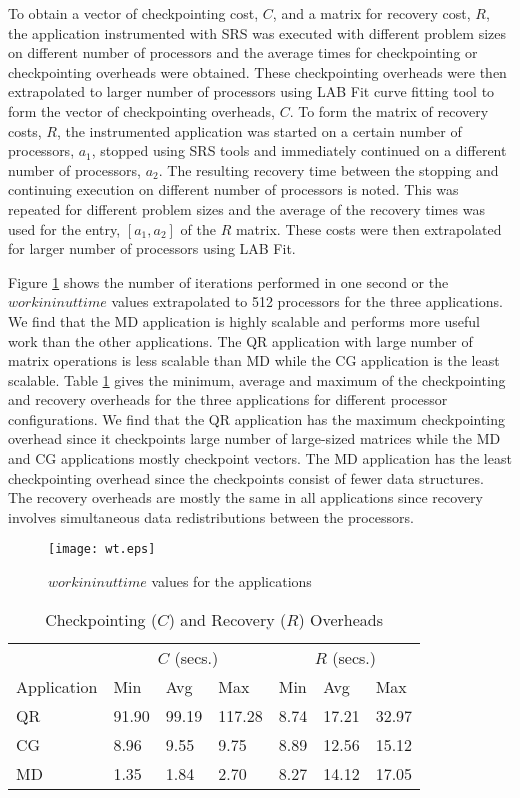 \documentclass[conference,10pt]{IEEEtran}
\begin{document}
To obtain a vector of checkpointing cost, $C$, and a matrix for
recovery cost, $R$, the application instrumented with SRS was executed
with different problem sizes on different number of processors and the
average times for checkpointing or checkpointing overheads were
obtained. These checkpointing overheads were then extrapolated to
larger number of processors using LAB Fit curve fitting
tool\cite{labfit} to form the vector of checkpointing overheads,
$C$. To form the matrix of recovery costs, $R$, the instrumented
application was started on a certain number of processors, $a_1$,
stopped using SRS tools and immediately continued on a different
number of processors, $a_2$. The resulting recovery time between the
stopping and continuing execution on different number of processors is
noted. This was repeated for different problem sizes and the average
of the recovery times was used for the entry, $[a_1,a_2]$ of the $R$
matrix. These costs were then extrapolated for larger number of
processors using LAB Fit.

Figure \ref{wt} shows the number of iterations performed in one second
or the $workininuttime$ values extrapolated to 512 processors for the
three applications. We find that the MD application is highly scalable
and performs more useful work than the other applications. The QR
application with large number of matrix operations is less
scalable than MD while the CG application is the least scalable. Table
\ref{overheads} gives the minimum, average and maximum of the
checkpointing and recovery overheads for the three applications for
different processor configurations. We find that the QR application
has the maximum checkpointing overhead since it checkpoints large
number of large-sized matrices while the MD and CG applications mostly
checkpoint vectors. The MD application has the least checkpointing
overhead since the checkpoints consist of fewer data structures. The
recovery overheads are mostly the same in all applications since
recovery involves simultaneous data redistributions between the
processors.

\begin{figure}
\centering
\texttt{[image: wt.eps]}
\caption{$workininuttime$ values for the applications}
\label{wt}
\end{figure}

\begin{table}
\centering
\caption{Checkpointing ($C$) and Recovery ($R$) Overheads}
\begin{tabular}{|p{0.5in}|p{0.3in}|p{0.3in}|p{0.3in}|p{0.3in}|p{0.3in}|p{0.3in}|}
\hline\hline
 & \multicolumn{3}{|c|}{$C$ (secs.)} &
\multicolumn{3}{|c|}{$R$ (secs.)} \\ \cline{2-7}
Application & Min & Avg & Max & Min & Avg & Max \\ \hline\hline
QR & 91.90 & 99.19 & 117.28 & 8.74 & 17.21 & 32.97 \\ \hline
CG & 8.96 & 9.55 & 9.75 & 8.89 & 12.56 & 15.12 \\ \hline
MD & 1.35 & 1.84 & 2.70 & 8.27 & 14.12 & 17.05 \\ \hline\hline
\end{tabular}
\label{overheads}
\end{table}
\end{document}
